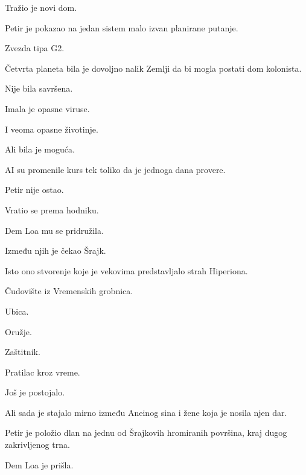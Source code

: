 \bigskip

Tražio je novi dom.

\bigskip

Petir je pokazao na jedan sistem malo izvan planirane putanje.

\bigskip

Zvezda tipa G2.

\bigskip

Četvrta planeta bila je dovoljno nalik Zemlji da bi mogla postati dom kolonista.

\bigskip

Nije bila savršena.

\bigskip

Imala je opasne viruse.

I veoma opasne životinje.

\bigskip

Ali bila je moguća.

\bigskip

AI su promenile kurs tek toliko da je jednoga dana provere.

\bigskip

Petir nije ostao.

\bigskip

Vratio se prema hodniku.

\bigskip

Dem Loa mu se pridružila.

\bigskip

Između njih je čekao Šrajk.

\bigskip

Isto ono stvorenje koje je vekovima predstavljalo strah Hiperiona.

\bigskip

Čudovište iz Vremenskih grobnica.

Ubica.

Oružje.

Zaštitnik.

Pratilac kroz vreme.

\bigskip

Još je postojalo.

\bigskip

Ali sada je stajalo mirno između Aneinog sina i žene koja je nosila njen dar.

\bigskip

Petir je položio dlan na jednu od Šrajkovih hromiranih površina, kraj dugog zakrivljenog trna.

\bigskip

Dem Loa je prišla.


